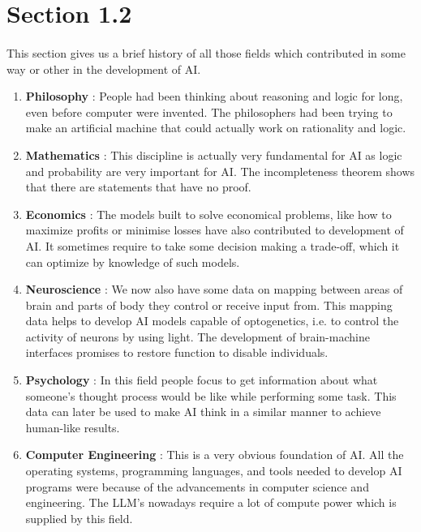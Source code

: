 \documentclass{article}
\begin{document}
\section{Section 1.2}
\paragraph{}
	This section gives us a brief history of all those fields which contributed in some way or other in the development of AI.

	\begin{enumerate}

		\item \textbf{Philosophy} : People had been thinking about reasoning and logic for long, even before computer were invented. The philosophers had been trying to make an artificial machine that could actually work on rationality and logic.

		\item \textbf{Mathematics} :  This discipline is actually very fundamental for AI as logic and probability are very important for AI. The incompleteness theorem shows that there are statements that have no proof. 

		\item \textbf{Economics} :  The models built to solve economical problems, like how to maximize profits or minimise losses have also contributed to development of AI. It sometimes require to take some decision making a trade-off, which it can optimize by knowledge of such models.	
		\item \textbf{Neuroscience} : We now also have some data on mapping between areas of brain and parts of body they control or receive input from. This mapping data helps to develop AI models capable of optogenetics, i.e. to control the activity of neurons by using light. The development of brain-machine interfaces promises to restore function to disable individuals.

		\item \textbf{Psychology} : In this field people focus to get information about what someone’s thought process would be like while performing some task. This data can later be used to make AI think in a similar manner to achieve human-like results.

		\item \textbf{Computer Engineering} : This is a very obvious foundation of AI. All the operating systems, programming languages, and tools needed to develop AI programs were because of the advancements in computer science and engineering. The LLM’s nowadays require a lot of compute power which is supplied by this field. 


\end{enumerate}
\end{document}
